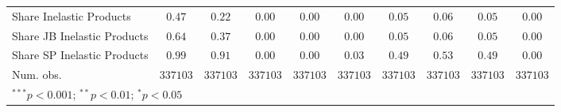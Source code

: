 \begin{tabular}{l c c c c c c c c c}
Share Inelastic Products    & $0.47$        & $0.22$        & $0.00$        & $0.00$        & $0.00$       & $0.05$        & $0.06$        & $0.05$        & $0.00$        \\
Share JB Inelastic Products & $0.64$        & $0.37$        & $0.00$        & $0.00$        & $0.00$       & $0.05$        & $0.06$        & $0.05$        & $0.00$        \\
Share SP Inelastic Products & $0.99$        & $0.91$        & $0.00$        & $0.00$        & $0.03$       & $0.49$        & $0.53$        & $0.49$        & $0.00$        \\
Num. obs.                   & $337103$      & $337103$      & $337103$      & $337103$      & $337103$     & $337103$      & $337103$      & $337103$      & $337103$      \\
\bottomrule
\multicolumn{10}{l}{\scriptsize{$^{***}p<0.001$; $^{**}p<0.01$; $^{*}p<0.05$}}
\end{tabular}
